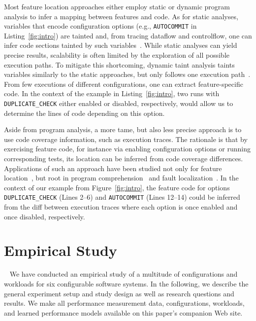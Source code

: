 Most feature location approaches either employ static or dynamic program analysis to infer a mapping between features and code. As for static analyses, variables that encode configuration options (e.g., \texttt{AUTOCOMMIT} in Listing~\ref{fig:intro}) are tainted and, from tracing dataflow and controlflow, one can infer code sections tainted by such variables~\cite{velez_2020_configcrusher_jase,lillack_2018_lotrack_tse,luo_2019_cova}.
While static analyses can yield precise results, scalability is often limited by the exploration of all possible execution paths. To mitigate this shortcoming, dynamic taint analysis taints variables similarly to the static approaches, but only follows one execution path~\cite{bell_phosphor_2014,velez_comprex_2021,splat_kim_2013}. From few executions of different configurations, one can extract feature-specific code. In the context of the example in Listing~\ref{fig:intro}, two runs with \texttt{DUPLICATE\_CHECK} either enabled or disabled, respectively, would allow us to determine the lines of code depending on this option.


Aside from program analysis, a more tame, but also less precise approach is to use code coverage information, such as execution traces.
The rationale is that by exercising feature code, for instance via enabling configuration options or running corresponding tests, its location can be inferred from code coverage differences. Applications of such an approach have been studied not only for feature location~\cite{wong_integrated_2005,sulir_annotation_2015,michelon_spectrum_2021,perez_framing_2016}, but root in program comprehension~\cite{wilde_early_1996,wilde_reconnaissance_1995,sherwood_reducing_nodate,perez_diagnosis_2014,castro_pangolin_2019} and fault localization~\cite{agrawal_fault_1995,wong_faultloc_2016}. In the context of our example from Figure~\ref{fig:intro}, the feature code for options \texttt{DUPLICATE\_CHECK} (\colorbox{duplicatecheck}{Lines 2--6}) and \texttt{AUTOCOMMIT} (\colorbox{autocommit}{Lines 12–14}) could be inferred from the diff between execution traces where each option is once enabled and once disabled, respectively.


\section{Empirical Study}~\label{sec:study}
We have conducted an empirical study of a multitude of configurations and workloads for six configurable software systems. In the following, we describe the general experiment setup and study design as well as research questions and results. We make all performance measurement data, configurations, workloads, and learned performance models available on this paper's companion Web site.


